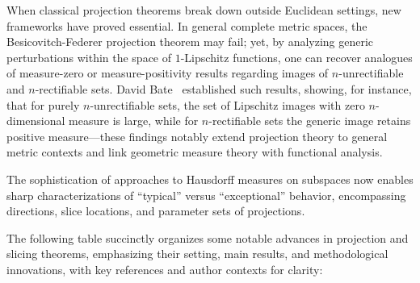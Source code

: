 \documentclass[sigconf]{acmart}
\begin{document}
When classical projection theorems break down outside Euclidean settings, new frameworks have proved essential. In general complete metric spaces, the Besicovitch-Federer projection theorem may fail; yet, by analyzing generic perturbations within the space of $1$-Lipschitz functions, one can recover analogues of measure-zero or measure-positivity results regarding images of $n$-unrectifiable and $n$-rectifiable sets. David Bate~\cite{ref43} established such results, showing, for instance, that for purely $n$-unrectifiable sets, the set of Lipschitz images with zero $n$-dimensional measure is large, while for $n$-rectifiable sets the generic image retains positive measure—these findings notably extend projection theory to general metric contexts and link geometric measure theory with functional analysis.

The sophistication of approaches to Hausdorff measures on subspaces now enables sharp characterizations of ``typical'' versus ``exceptional'' behavior, encompassing directions, slice locations, and parameter sets of projections.

The following table succinctly organizes some notable advances in projection and slicing theorems, emphasizing their setting, main results, and methodological innovations, with key references and author contexts for clarity:
\end{document}
